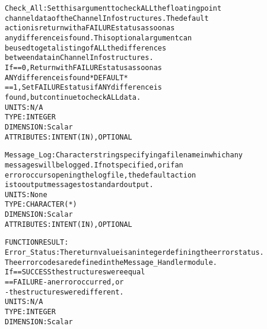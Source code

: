 \begin{alltt}
        Check_All:      Set this argument to check ALL the floating point
                        channel data of the ChannelInfo structures. The default
                        action is return with a FAILURE status as soon as
                        any difference is found. This optional argument can
                        be used to get a listing of ALL the differences
                        between data in ChannelInfo structures.
                        If == 0, Return with FAILURE status as soon as
                                 ANY difference is found  *DEFAULT*
                           == 1, Set FAILURE status if ANY difference is
                                 found, but continue to check ALL data.
                        UNITS:      N/A
                        TYPE:       INTEGER
                        DIMENSION:  Scalar
                        ATTRIBUTES: INTENT(IN), OPTIONAL
 
        Message_Log:    Character string specifying a filename in which any
                        messages will be logged. If not specified, or if an
                        error occurs opening the log file, the default action
                        is to output messages to standard output.
                        UNITS:      None
                        TYPE:       CHARACTER(*)
                        DIMENSION:  Scalar
                        ATTRIBUTES: INTENT(IN), OPTIONAL
 
  FUNCTION RESULT:
        Error_Status:   The return value is an integer defining the error status.
                        The error codes are defined in the Message_Handler module.
                        If == SUCCESS the structures were equal
                           == FAILURE - an error occurred, or
                                      - the structures were different.
                        UNITS:      N/A
                        TYPE:       INTEGER
                        DIMENSION:  Scalar
 
  \end{alltt}
